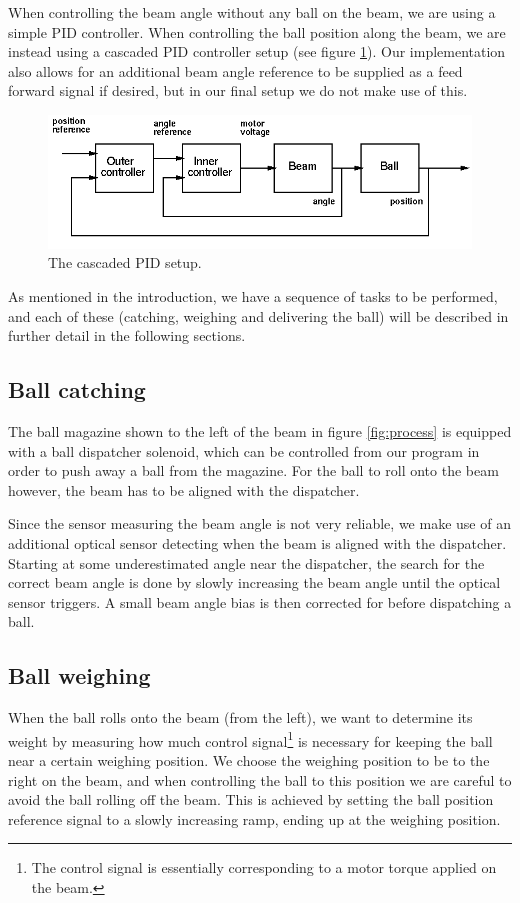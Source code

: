 When controlling the beam angle without any ball on the beam, we are using a simple PID controller.
When controlling the ball position along the beam, we are instead using a cascaded PID controller setup (see figure \ref{fig:cascaded_pid}).
Our implementation also allows for an additional beam angle reference to be supplied as a feed forward signal if desired, but in our final setup we do not make use of this.
\begin{figure}
\centering
\includegraphics[width=\textwidth]{figures/block_diagram.png}
\caption{The cascaded PID setup.}\label{fig:cascaded_pid}
\end{figure}

As mentioned in the introduction, we have a sequence of tasks to be performed, and each of these (catching, weighing and delivering the ball) will be described in further detail in the following sections.

\subsection{Ball catching}\label{sec:ball_catching}
The ball magazine shown to the left of the beam in figure \ref{fig:process} is equipped with a ball dispatcher solenoid, which can be controlled from our program in order to push away a ball from the magazine.
For the ball to roll onto the beam however, the beam has to be aligned with the dispatcher.

Since the sensor measuring the beam angle is not very reliable, we make use of an additional optical sensor detecting when the beam is aligned with the dispatcher.
Starting at some underestimated angle near the dispatcher, the search for the correct beam angle is done by slowly increasing the beam angle until the optical sensor triggers. A small beam angle bias is then corrected for before dispatching a ball.

\subsection{Ball weighing}\label{sec:ball_weighing}
When the ball rolls onto the beam (from the left), we want to determine its weight by measuring how much control signal\footnote{The control signal is essentially corresponding to a motor torque applied on the beam.} is necessary for keeping the ball near a certain weighing position.
We choose the weighing position to be to the right on the beam, and when controlling the ball to this position we are careful to avoid the ball rolling off the beam.
This is achieved by setting the ball position reference signal to a slowly increasing ramp, ending up at the weighing position.

